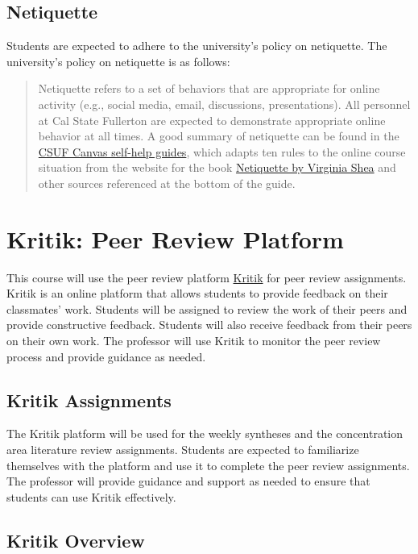 \documentclass[12pt, letterpaper]{article}
\begin{document}
\subsection*{Netiquette}
Students are expected to adhere to the university's policy on netiquette. The university's policy on netiquette is as follows:
\begin{quote}Netiquette refers to a set of behaviors that are appropriate for online activity (e.g., social media, email, discussions, presentations). All personnel at Cal State Fullerton are expected to demonstrate appropriate online behavior at all times. A good summary of netiquette can be found in the \href{https://canvashelp.fullerton.edu/m/Student/l/1336786-student-what-is-netiquette}{CSUF Canvas self-help guides}, which adapts ten rules to the online course situation from the website for the book \href{http://www.albion.com/netiquette/corerules.html}{Netiquette by Virginia Shea} and other sources referenced at the bottom of the guide.\end{quote}


\section*{Kritik: Peer Review Platform}

\noindent This course will use the peer review platform \href{https://kritik.io/}{Kritik} for peer review assignments. Kritik is an online platform that allows students to provide feedback on their classmates' work. Students will be assigned to review the work of their peers and provide constructive feedback. Students will also receive feedback from their peers on their own work. The professor will use Kritik to monitor the peer review process and provide guidance as needed.

\subsection*{Kritik Assignments}
\noindent The Kritik platform will be used for the weekly syntheses and the concentration area literature review assignments. Students are expected to familiarize themselves with the platform and use it to complete the peer review assignments. The professor will provide guidance and support as needed to ensure that students can use Kritik effectively.

\subsection*{Kritik Overview}
\end{document}
